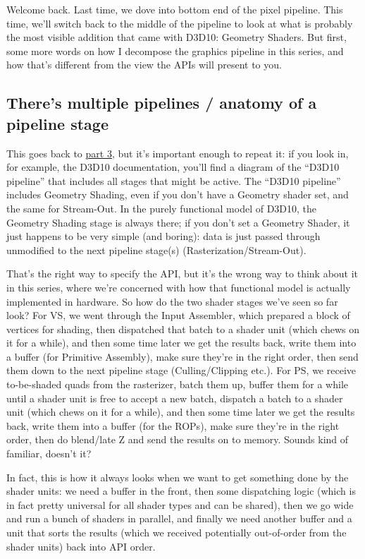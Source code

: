 \documentclass[12pt]{article}
\begin{document}
Welcome back. Last time, we dove into bottom end of the pixel pipeline. This time, we’ll switch back to the middle of the pipeline to look at what is probably the most visible addition that came with D3D10: Geometry Shaders. But first, some more words on how I decompose the graphics pipeline in this series, and how that’s different from the view the APIs will present to you.

\subsection{There’s multiple pipelines / anatomy of a pipeline stage}
\label{sec:orga44ff3e}

This goes back to \hyperref[part3]{part 3}, but it’s important enough to repeat it: if you look in, for example, the D3D10 documentation, you’ll find a diagram of the “D3D10 pipeline” that includes all stages that might be active. The “D3D10 pipeline” includes Geometry Shading, even if you don’t have a Geometry shader set, and the same for Stream-Out. In the purely functional model of D3D10, the Geometry Shading stage is always there; if you don’t set a Geometry Shader, it just happens to be very simple (and boring): data is just passed through unmodified to the next pipeline stage(s) (Rasterization/Stream-Out).

That’s the right way to specify the API, but it’s the wrong way to think about it in this series, where we’re concerned with how that functional model is actually implemented in hardware. So how do the two shader stages we’ve seen so far look? For VS, we went through the Input Assembler, which prepared a block of vertices for shading, then dispatched that batch to a shader unit (which chews on it for a while), and then some time later we get the results back, write them into a buffer (for Primitive Assembly), make sure they’re in the right order, then send them down to the next pipeline stage (Culling/Clipping etc.). For PS, we receive to-be-shaded quads from the rasterizer, batch them up, buffer them for a while until a shader unit is free to accept a new batch, dispatch a batch to a shader unit (which chews on it for a while), and then some time later we get the results back, write them into a buffer (for the ROPs), make sure they’re in the right order, then do blend/late Z and send the results on to memory. Sounds kind of familiar, doesn’t it?

In fact, this is how it always looks when we want to get something done by the shader units: we need a buffer in the front, then some dispatching logic (which is in fact pretty universal for all shader types and can be shared), then we go wide and run a bunch of shaders in parallel, and finally we need another buffer and a unit that sorts the results (which we received potentially out-of-order from the shader units) back into API order.
\end{document}
